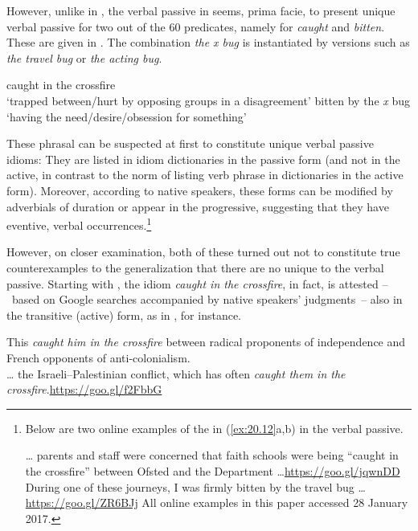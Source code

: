 \documentclass[output=paper]{langsci/langscibook}
\begin{document}
However, unlike in , the verbal passive in  seems,
prima facie, to present unique verbal passive 
for two out of the 60
predicates, namely for \emph{caught} and \emph{bitten}. These  are given
in . The combination \emph{the x bug} is instantiated by
versions such as \emph{the travel bug} or \emph{the acting bug}.

\ea\label{ex:20.12}
    \ea\label{ex:20.12a} caught in the crossfire\\
        ‘trapped between/hurt by opposing groups in a disagreement’
    \ex\label{ex:20.12b} bitten by the \emph{x} bug\\
        ‘having the need/desire/obsession for something’
    \z
\z

These phrasal  can be suspected at first to constitute unique verbal
passive idioms: They are listed in idiom dictionaries in the passive form (and
not in the active, in contrast to the norm of listing verb phrase  in
dictionaries in the active form). Moreover, according to native speakers, these
forms can be modified by adverbials of duration or appear in the progressive,
suggesting that they have eventive, verbal occurrences.\footnote{Below
are two online examples of the  in (\ref{ex:20.12}a,b) in the
verbal passive.

\ea \dots{} parents and staff were concerned that faith schools were
    being “caught in the crossfire” between Ofsted and the Department
    \dots{}\hspace*{\fill}\url{https://goo.gl/jqwnDD}
\ex During one of these journeys, I was firmly bitten by the travel
    bug \dots{}\\\hspace*{\fill}\url{https://goo.gl/ZR6BJj}
\z
All online examples in this paper accessed 28 January 2017.}

However, on closer examination, both of these turned out not to constitute true
counterexamples to the generalization that there are no  unique to the
verbal passive. Starting with , the idiom \emph{caught in the crossfire}, 
in fact, is attested –~based on Google searches accompanied by native speakers’ judgments~– 
also in the transitive (active) form, as in , for instance.

\ea\label{ex:20.13}
    \ea This \textit{caught him in the crossfire} between radical proponents of
    independence and {French} opponents of anti-colonialism.\\
    \hspace*{\fill}\parencite[282]{Scheck2014}
    \ex \dots{} the Israeli--Palestinian conflict, which has often
    \textit{caught them in the crossfire}.\hspace*{\fill}\url{https://goo.gl/f2FbbG}
    \z
\z
\end{document}
